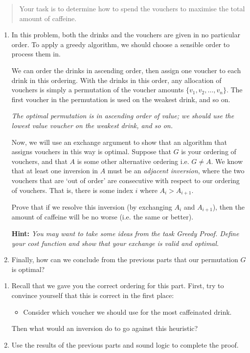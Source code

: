 \documentclass[12pt]{article}
\begin{document}
\begin{question}
\begin{quote}
    Your task is to determine how to spend the vouchers to maximise the total amount of caffeine.
\end{quote}
\begin{enumerate}
    \item In this problem, both the drinks and the vouchers are given in no particular order. To apply a greedy algorithm, we should choose a sensible order to process them in. 
    
    We can order the drinks in ascending order, then assign one voucher to each drink in this ordering. With the drinks in this order, any allocation of vouchers is simply a permutation of the voucher amounts $\{v_1,v_2,\ldots,v_n\}$. The first voucher in the permutation is used on the weakest drink, and so on.

    \textit{The optimal permutation is in ascending order of value; we should use the lowest value voucher on the weakest drink, and so on.}
    
    Now, we will use an exchange argument to show that an algorithm that assigns vouchers in this way is optimal. Suppose that $G$ is your ordering of vouchers, and that $A$ is some other alternative ordering i.e. $G \neq A$. We know that at least one inversion in $A$ must be an \textit{adjacent inversion}, where the two vouchers that are `out of order' are consecutive with respect to our ordering of vouchers. That is, there is some index $i$ where $A_i > A_{i+1}$. 

    Prove that if we resolve this inversion (by exchanging $A_i$ and $A_{i+1}$), then the amount of caffeine will be no worse (i.e. the same or better).

    \textbf{Hint:} \textit{You may want to take some ideas from the task Greedy Proof. Define your cost function and show that your exchange is valid and optimal.}
    \item Finally, how can we conclude from the previous parts that our permutation $G$ is optimal?
\end{enumerate}

\end{question}

\begin{rubric}
\begin{enumerate}
    \item 
      Recall that we gave you the correct ordering for this part. First, try to convince yourself that this is correct in the first place:
        \begin{itemize}
            \item Consider which voucher we should use for the most caffeinated drink.
        \end{itemize}
        Then what would an inversion do to go against this heuristic?
    \item Use the results of the previous parts and sound logic to complete the proof.
\end{enumerate}

\end{rubric}
\clearpage

\begin{solution}
\end{solution}
\begin{attribution}
\end{attribution}
\end{document}
